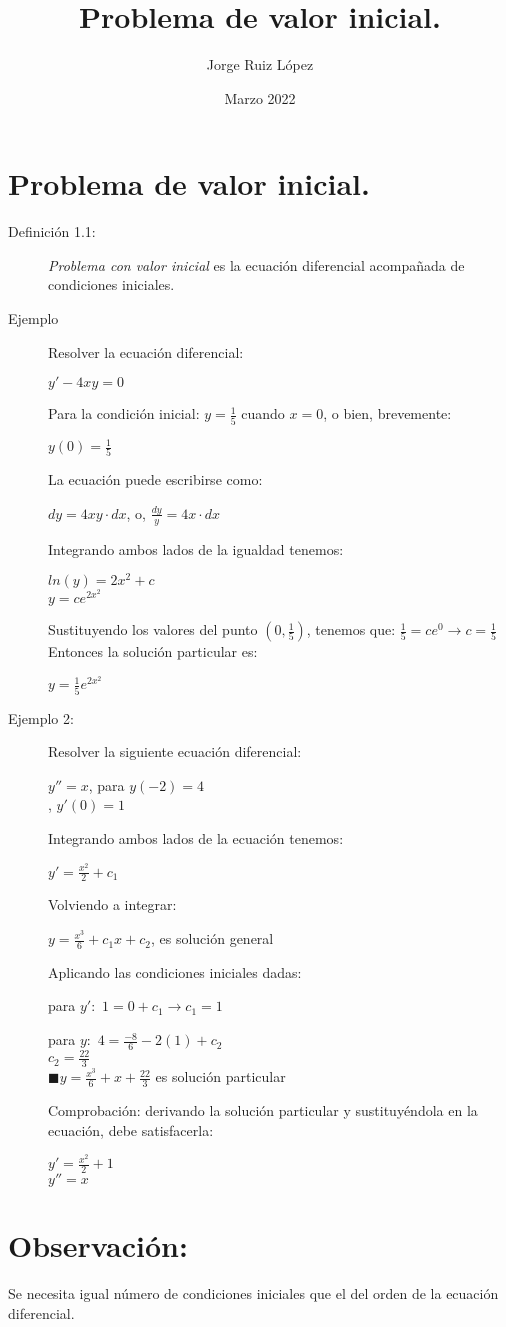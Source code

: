 \documentclass{article}
\title{Problema de valor inicial.}
\author{Jorge Ruiz López}
\affil{Facultad de Ingeniería UNAM}
\date{Marzo 2022}
\begin{document}
\maketitle
\section{Problema de valor inicial.}
\begin{description}
\item[Definición 1.1:]\cite{carmona} \emph{Problema con valor inicial} es la ecuación diferencial acompañada de condiciones iniciales.\\
\item[Ejemplo]
Resolver la ecuación diferencial:
\begin{center}$y'-4xy = 0$\end{center}
Para la condición inicial: $y = \frac{1}{5}$ cuando $x = 0$, o bien, brevemente:
\begin{center}$y(0)=\frac{1}{5} $\end{center}
La ecuación puede escribirse como:
\begin{center}$dy=4xy\cdot dx$,  o, $\frac{dy}{y} = 4x\cdot dx$\end{center}
Integrando ambos lados de la igualdad tenemos:\\
\begin{center}$ln(y) = 2x^2+c$\\$y=ce^{2x^{2}}$ \end{center}
Sustituyendo los valores del punto $(0, \frac{1}{5})$, tenemos que: $\frac{1}{5} = ce^0 \rightarrow c=\frac{1}{5}$\\
Entonces la solución particular es:
\begin{center}$y=\frac{1}{5}e^{2x^2}$\end{center}
\item[Ejemplo 2:]
Resolver la siguiente ecuación diferencial:
\begin{center}$y''= x$, para $y(-2) = 4$\\, $y'(0)=1$\end{center}
Integrando ambos lados de la ecuación tenemos:
\begin{center}$y'=\frac{x^2}{2}+c_1$\end{center}
Volviendo a integrar:
\begin{center}$y=\frac{x^3}{6}+c_1x+c_2$, es solución general\end{center}
Aplicando las condiciones iniciales dadas:
\begin{center}para $y':$ \tab $1=0+c_1 \rightarrow c_1 =1$\end{center}
\begin{center}para $y:$ \tab $4=\frac{-8}{6}-2(1)+c_2$\\$c_2 = \frac{22}{3}$\\$\blacksquare y= \frac{x^3}{6}+x+\frac{22}{3}$ es solución particular\end{center}
Comprobación: derivando la solución particular y sustituyéndola en la ecuación, debe satisfacerla:
\begin{center}$y'= \frac{x^2}{2}+ 1$\\$y''=x$\end{center}

\end{description}
\section{Observación:}Se necesita igual número de condiciones iniciales que el del orden de la ecuación diferencial.
\printbibliography
\end{document}
